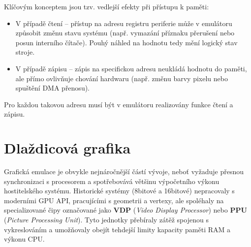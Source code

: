 Klíčovým konceptem jsou tzv. vedlejší efekty při přístupu k paměti:

\begin{itemize}

\item V případě čtení -- přístup na adresu registru periferie může v emulátoru způsobit změnu stavu
    systému (např. vymazání příznaku přerušení nebo posun interního čítače). Pouhý náhled na hodnotu
    tedy mění logický stav stroje.

\item V případě zápisu -- zápis na specifickou adresu neukládá hodnotu do paměti, ale přímo ovlivňuje
    chování hardwaru (např. změnu barvy pixelu nebo spuštění DMA přenosu).

\end{itemize}

Pro každou takovou adresu musí být v emulátoru realizovány funkce čtení a zápisu.

%
%

\section{Dlaždicová grafika}

Grafická emulace je obvykle nejnáročnější částí vývoje, neboť vyžaduje přesnou synchronizaci s
procesorem a spotřebovává většinu výpočetního výkonu hostitelského systému. Historické systémy
(8bitové a 16bitové) nepracovaly s moderními GPU API, pracujícími s geometrii a vertexy, ale
spoléhaly na specializované čipy označované jako \textbf{VDP} (\textit{Video Display Processor})
nebo \textbf{PPU} (\textit{Picture Processing Unit}). Tyto jednotky přebíraly zátěž spojenou s
vykreslováním a umožňovaly obejít tehdejší limity kapacity paměti RAM a výkonu CPU.

